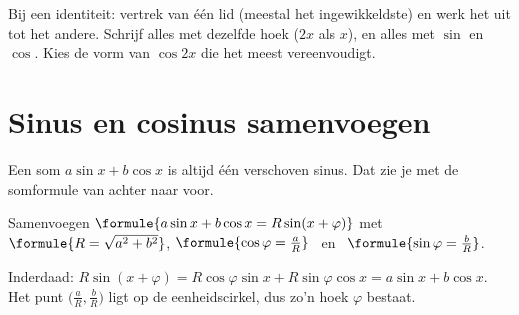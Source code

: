 \begin{oefeningen}
\end{oefeningen}


\begin{werkwijze}
Bij een identiteit: vertrek van één lid (meestal het ingewikkeldste) en werk het uit tot het andere. Schrijf alles met dezelfde hoek ($2x$ als $x$), en alles met $\sin$ en $\cos$. Kies de vorm van $\cos 2x$ die het meest vereenvoudigt.
\end{werkwijze}

\begin{oefeningen}


\end{oefeningen}

\section{Sinus en cosinus samenvoegen}

Een som $a\sin x + b\cos x$ is altijd één verschoven sinus. Dat zie je met de somformule van achter naar voor.

\begin{theorie}
\begin{stelling}{Samenvoegen}
$\formule{a\sin x + b\cos x = R\sin(x + \varphi)}$ \quad met \quad $\formule{R = \sqrt{a^2 + b^2}}$, \quad $\formule{\cos\varphi = \frac{a}{R}}$ \ en \ $\formule{\sin\varphi = \frac{b}{R}}$.
\end{stelling}
\end{theorie}

Inderdaad: $R\sin(x + \varphi) = R\cos\varphi \sin x + R\sin\varphi \cos x = a\sin x + b\cos x$. Het punt $\bigl(\frac{a}{R}, \frac{b}{R}\bigr)$ ligt op de eenheidscirkel, dus zo'n hoek $\varphi$ bestaat.

